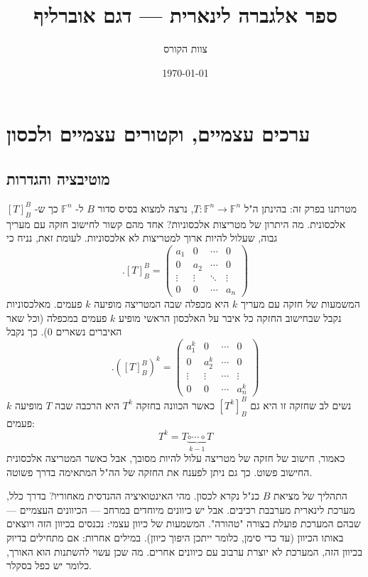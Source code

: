\documentclass[12pt]{report}
\title{ספר אלגברה לינארית — דגם אוברליף}
\author{צוות הקורס}
\date{\today}
\theoremstyle{plain}
\theoremstyle{definition}
\newcommand{\F}{\mathbb{F}}
\newcommand{\0}{\mathbf{0}}
\begin{document}
\maketitle

\chapter{ערכים עצמיים, וקטורים עצמיים ולכסון}\label{ch:diagonal}

\section{מוטיבציה והגדרות}

מטרתנו בפרק זה: בהינתן ה"ל
$T:\F^n\to\F^n$,
נרצה למצוא בסיס סדור 
$B$
ל-
$\F^n$
כך ש-
$[T]_B^B$
אלכסונית. מה היתרון של מטריצות אלכסוניות? אחד מהם קשור לחישוב חזקה עם מעריך גבוה, שעלול להיות ארוך למטריצות לא אלכסוניות. לעומת זאת, נניח כי
$$
.[T]_B^B=\begin{pmatrix}
a_1 & 0 & \cdots & 0 \\
0 & a_2 & \cdots & 0 \\
\vdots & \vdots & \ddots & \vdots \\
0 & 0 & \cdots & a_n
\end{pmatrix}
$$
המשמעות של חזקה עם מעריך 
$k$
היא מכפלה שבה המטריצה מופיעה
$k$
פעמים. מאלכסוניות נקבל שבחישוב החזקה כל איבר על האלכסון הראשי מופיע
$k$
פעמים במכפלה
(וכל שאר האיברים נשארים 
$0$).
כך נקבל
$$
.([T]_B^B)^k=\begin{pmatrix}
a_1^k & 0 & \cdots & 0 \\
0 & a_2^k & \cdots & 0 \\
\vdots & \vdots & \cdots & \vdots \\
0 & 0 & \cdots & a_n^k
\end{pmatrix}
$$
נשים לב שחזקה זו היא גם
$[T^k]_B^B$
כאשר הכוונה בחזקה
$T^k$
היא הרכבה שבה
$T$
מופיעה 
$k$
פעמים:
$$
T^k=T\underbrace{\circ\cdots\circ}_{k-1} T
$$
כאמור, חישוב של חזקה של מטריצה עלול להיות מסובך, אבל כאשר המטריצה אלכסונית החישוב פשוט. כך גם ניתן לפענח את החזקה של הה"ל המתאימה בדרך פשוטה.

התהליך של מציאת 
$B$
כנ"ל נקרא לכסון. מהי האינטואיציה ההנדסית מאחוריו? בדרך כלל, מערכת לינארית מערבבת רכיבים. אבל יש כיוונים מיוחדים במרחב — הכיוונים העצמיים — שבהם המערכת פועלת בצורה "טהורה". המשמעות של כיוון עצמי: נכנסים בכיוון הזה ויוצאים באותו הכיוון (עד כדי סימן, כלומר ייתכן היפוך כיוון). במילים אחרות: אם מתחילים בדיוק בכיוון הזה, המערכת לא יוצרת ערבוב עם כיוונים אחרים. מה שכן עשוי להשתנות הוא האורך, כלומר יש כפל בסקלר.
\end{document}
